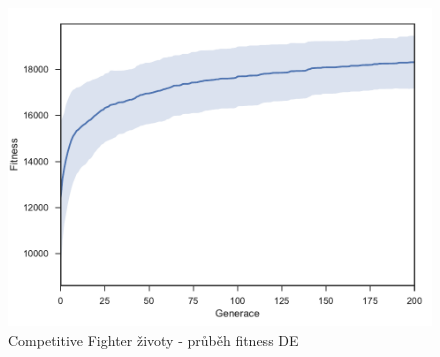 \begin{figure}[h]\centering
	\includegraphics[width=0.75\columnwidth]{../img/CompetitiveMap/FighterKeep}
	\caption{Competitive Fighter životy - průběh fitness DE}
	\label{obr04:CompetitiveFighterKeep}
\end{figure}
\clearpage
